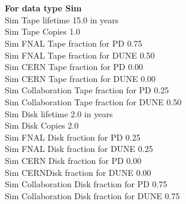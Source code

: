 \documentclass[12pt]{article}
\begin{document}
\pagebreak\\
\\
{\bf For data type Sim}\\
   Sim Tape lifetime  15.0 in years\\
   Sim Tape Copies   1.0\\
   Sim FNAL Tape fraction for PD  0.75\\
   Sim FNAL Tape fraction for DUNE  0.50\\
   Sim CERN Tape fraction for PD  0.00\\
   Sim CERN Tape fraction for DUNE  0.00\\
   Sim Collaboration Tape fraction for PD  0.25\\
   Sim Collaboration Tape fraction for DUNE  0.50\\
   Sim Disk lifetime   2.0 in years\\
   Sim Disk Copies   2.0\\
   Sim FNAL Disk fraction for PD  0.25\\
   Sim FNAL Disk fraction for DUNE  0.25\\
   Sim CERN Disk fraction for PD  0.00\\
   Sim CERNDisk fraction for DUNE  0.00\\
   Sim Collaboration Disk fraction for PD  0.75\\
   Sim Collaboration Disk fraction for DUNE  0.75\\
\pagebreak\\
\end{document}

